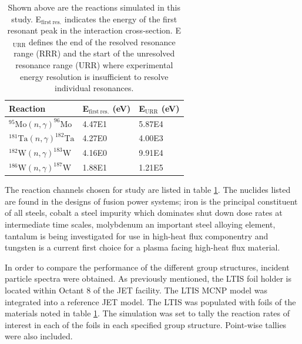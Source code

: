 \begin{table}[h]
  \centering
  \begin{tabular}{lll}
    \toprule
    Reaction                                       & E$_\mathrm{first\ res.}$ (eV) & E$_\mathrm{URR}$ (eV) \\ 
    \midrule
    $^{95}\mathrm{Mo}(n,\gamma)^{96}\mathrm{Mo}$   & 4.47E1                        & 5.87E4                \\
    $^{181}\mathrm{Ta}(n,\gamma)^{182}\mathrm{Ta}$ & 4.27E0                        & 4.00E3                \\
    $^{182}\mathrm{W}(n,\gamma)^{183}\mathrm{W}$   & 4.16E0                        & 9.91E4                \\
    $^{186}\mathrm{W}(n,\gamma)^{187}\mathrm{W}$   & 1.88E1                        & 1.21E5                \\ 
    \bottomrule
  \end{tabular}
  \caption{Shown above are the reactions simulated in this study. E$_\mathrm{first\ res.}$ indicates the energy of the first resonant peak in the interaction cross-section. E$_\mathrm{URR}$ defines the end of the resolved resonance range (RRR) and the start of the unresolved resonance range (URR) where experimental energy resolution is insufficient to resolve individual resonances.}
  \label{tab:reactions}
\end{table}

The reaction channels chosen for study are listed in table \ref{tab:reactions}. The nuclides listed are found in the designs of fusion power systems; iron is the principal constituent of all steels, cobalt a steel impurity which dominates shut down dose rates at intermediate time scales, molybdenum an important steel alloying element, tantalum is being investigated for use in high-heat flux componentry and tungsten is a current first choice for a plasma facing high-heat flux material.

In order to compare the performance of the different group structures, incident particle spectra were obtained. As previously mentioned, the LTIS foil holder is located within Octant 8 of the JET facility. The LTIS MCNP model \cite{lengar2017} was integrated into a reference JET model. The LTIS was populated with foils of the materials noted in table \ref{tab:reactions}. The simulation was set to tally the reaction rates of interest in each of the foils in each specified group structure. Point-wise tallies were also included.

